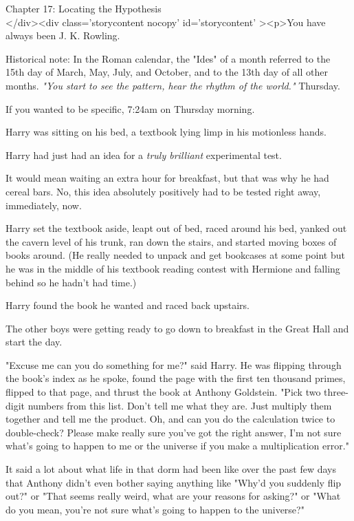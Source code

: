 
Chapter 17: Locating the Hypothesis\\
</div><div  class='storycontent nocopy' id='storycontent' ><p>You have always 
been J. K. Rowling.

Historical note: In the Roman calendar, the "Ides" of a month referred to the 
15th day of March, May, July, and October, and to the 13th day of all other 
months.
\sbreak
\emph{"You start to see the pattern, hear the rhythm of the world."}
\sbreak
Thursday.

If you wanted to be specific, 7:24am on Thursday morning.

Harry was sitting on his bed, a textbook lying limp in his motionless hands.

Harry had just had an idea for a \emph{truly brilliant} experimental test.

It would mean waiting an extra hour for breakfast, but that was why he had 
cereal bars. No, this idea absolutely positively had to be tested right away, 
immediately, now.

Harry set the textbook aside, leapt out of bed, raced around his bed, yanked 
out the cavern level of his trunk, ran down the stairs, and started moving 
boxes of books around. (He really needed to unpack and get bookcases at some 
point but he was in the middle of his textbook reading contest with Hermione 
and falling behind so he hadn't had time.)

Harry found the book he wanted and raced back upstairs.

The other boys were getting ready to go down to breakfast in the Great Hall and 
start the day.

"Excuse me can you do something for me?" said Harry. He was flipping through 
the book's index as he spoke, found the page with the first ten thousand 
primes, flipped to that page, and thrust the book at Anthony Goldstein. "Pick 
two three-digit numbers from this list. Don't tell me what they are. Just 
multiply them together and tell me the product. Oh, and can you do the 
calculation twice to double-check? Please make really sure you've got the right 
answer, I'm not sure what's going to happen to me or the universe if you make a 
multiplication error."

It said a lot about what life in that dorm had been like over the past few days 
that Anthony didn't even bother saying anything like "Why'd you suddenly flip 
out?" or "That seems really weird, what are your reasons for asking?" or "What 
do you mean, you're not sure what's going to happen to the universe?"

